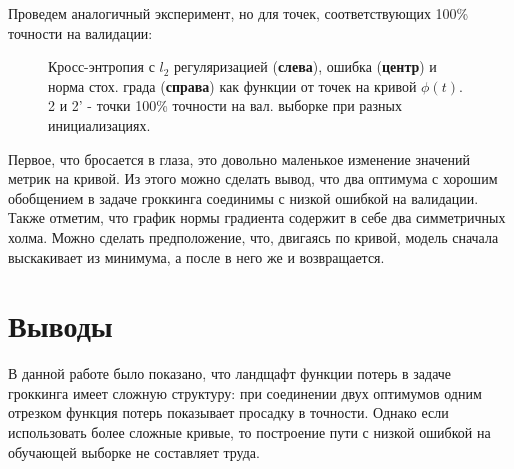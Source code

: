 \documentclass{article} %
\begin{document}
Проведем аналогичный эксперимент, но для точек, соответствующих 100\% точности на валидации:
\begin{figure}[!ht]
    \centering
    \caption{Кросс-энтропия с $l_2$ регуляризацией (\textbf{слева}), ошибка (\textbf{центр}) и норма стох. града (\textbf{справа}) как функции от точек на кривой $\phi(t)$. 2 и 2' - точки 100\% точности на вал. выборке при разных инициализациях.}
    \label{fig:pol_chain22}
\end{figure}

Первое, что бросается в глаза, это довольно маленькое изменение значений метрик на кривой. Из этого можно сделать вывод, что два оптимума с хорошим обобщением в задаче гроккинга соединимы с низкой ошибкой на валидации. Также отметим, что график нормы градиента содержит в себе два симметричных холма. Можно сделать предположение, что, двигаясь по кривой, модель сначала выскакивает из минимума, а после в него же и возвращается. 
\section{Выводы}
В данной работе было показано, что ландщафт функции потерь в задаче гроккинга имеет сложную структуру: при соединении двух оптимумов одним отрезком функция потерь показывает просадку в точности. Однако если использовать более сложные кривые, то построение пути с низкой ошибкой на обучающей выборке не составляет труда.
\end{document}
